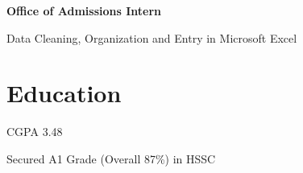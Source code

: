 \documentclass[]{resume}
\begin{document}
\begin{minipage}[t]{0.59\textwidth}
\thinspace \textbf{Office of Admissions Intern}

\begin{tightemize}
\sectionsep
\item Data Cleaning, Organization and Entry in Microsoft Excel
\end{tightemize}


\section{Education} 
 
\begin{tightemize}
    \item CGPA 3.48
\end{tightemize}
    
    
     
    \begin{tightemize}
        \item Secured A1 Grade (Overall 87\%) in HSSC
    \end{tightemize}
    

\end{minipage}
\end{document}
